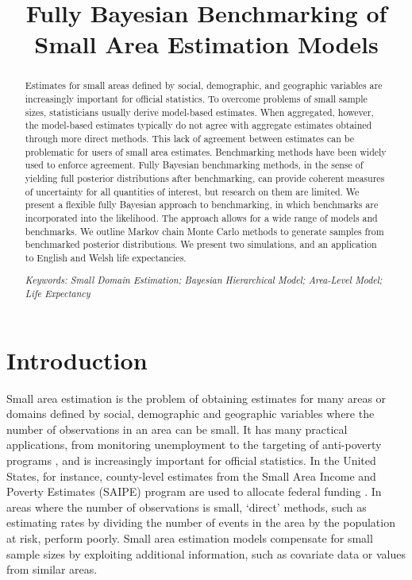 \documentclass[12pt]{article}
\title{Fully Bayesian Benchmarking of Small Area Estimation Models}
\author{}
\date{}
\begin{document}
\maketitle

\begin{abstract}
Estimates for small areas defined by social, demographic, and geographic variables are increasingly important for official statistics. To overcome problems of small sample sizes, statisticians usually derive model-based estimates.  When aggregated, however, the model-based estimates typically do not agree with aggregate estimates obtained through more direct methods.  This lack of agreement between estimates can be problematic for users of small area estimates.  Benchmarking methods have been widely used to enforce agreement. Fully Bayesian benchmarking methods, in the sense of yielding full posterior distributions after benchmarking, can provide coherent measures of uncertainty for all quantities of interest, but research on them are limited.  We present a flexible fully Bayesian approach to benchmarking, in which benchmarks are incorporated into the likelihood.  The approach allows for a wide range of models and benchmarks.  We outline Markov chain Monte Carlo methods to generate samples from benchmarked posterior distributions.  We present two simulations, and an application to English and Welsh life expectancies.

{\it Keywords: Small Domain Estimation; Bayesian Hierarchical Model; Area-Level Model; Life Expectancy}
\end{abstract}


\section{Introduction}
  \label{sec:intro}

Small area estimation is the problem of obtaining estimates for many areas or domains defined by social, demographic and geographic variables where the number of observations in an area can be small. It has many practical applications, from monitoring unemployment to the targeting of anti-poverty programs \citep{pfeffermann2013new,rao2015small}, and is increasingly important for official statistics.  In the United States, for instance, county-level estimates from the Small Area Income and Poverty Estimates (SAIPE) program are used to allocate federal funding \citep{census2013saipe}.  In areas where the number of observations is small, `direct' methods, such as estimating rates by dividing the number of events in the area by the population at risk, perform poorly.  Small area estimation models compensate for small sample sizes by exploiting additional information, such as covariate data or values from similar areas.
\end{document}
